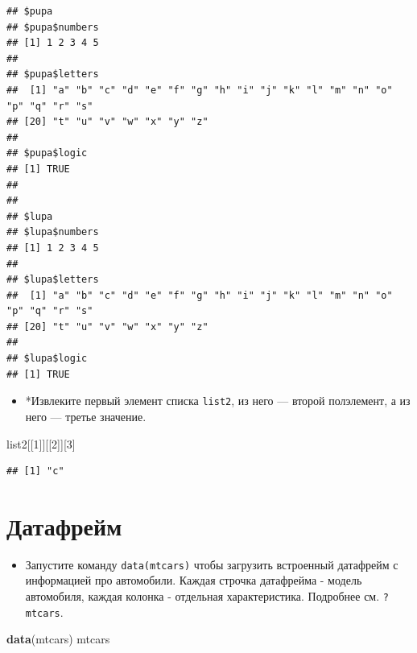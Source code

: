 \documentclass[]{book}
\newenvironment{Shaded}{\begin{snugshade}}{\end{snugshade}}
\newcommand{\KeywordTok}[1]{\textcolor[rgb]{0.13,0.29,0.53}{\textbf{#1}}}
\newcommand{\DecValTok}[1]{\textcolor[rgb]{0.00,0.00,0.81}{#1}}
\newcommand{\NormalTok}[1]{#1}
\providecommand{\tightlist}{%
  \setlength{\itemsep}{0pt}\setlength{\parskip}{0pt}}
\begin{document}
\begin{verbatim}
## $pupa
## $pupa$numbers
## [1] 1 2 3 4 5
## 
## $pupa$letters
##  [1] "a" "b" "c" "d" "e" "f" "g" "h" "i" "j" "k" "l" "m" "n" "o" "p" "q" "r" "s"
## [20] "t" "u" "v" "w" "x" "y" "z"
## 
## $pupa$logic
## [1] TRUE
## 
## 
## $lupa
## $lupa$numbers
## [1] 1 2 3 4 5
## 
## $lupa$letters
##  [1] "a" "b" "c" "d" "e" "f" "g" "h" "i" "j" "k" "l" "m" "n" "o" "p" "q" "r" "s"
## [20] "t" "u" "v" "w" "x" "y" "z"
## 
## $lupa$logic
## [1] TRUE
\end{verbatim}

\begin{itemize}
\tightlist
\item
  *Извлеките первый элемент списка \texttt{list2}, из него --- второй
  полэлемент, а из него --- третье значение.
\end{itemize}

\begin{Shaded}
\begin{Highlighting}[]
\NormalTok{list2[[}\DecValTok{1}\NormalTok{]][[}\DecValTok{2}\NormalTok{]][}\DecValTok{3}\NormalTok{]}
\end{Highlighting}
\end{Shaded}

\begin{verbatim}
## [1] "c"
\end{verbatim}

\section{Датафрейм}\label{solution_df}

\begin{itemize}
\tightlist
\item
  Запустите команду \texttt{data(mtcars)} чтобы загрузить встроенный
  датафрейм с информацией про автомобили. Каждая строчка датафрейма -
  модель автомобиля, каждая колонка - отдельная характеристика.
  Подробнее см. \texttt{?mtcars}.
\end{itemize}

\begin{Shaded}
\begin{Highlighting}[]
\KeywordTok{data}\NormalTok{(mtcars)}
\NormalTok{mtcars}
\end{Highlighting}
\end{Shaded}
\end{document}
